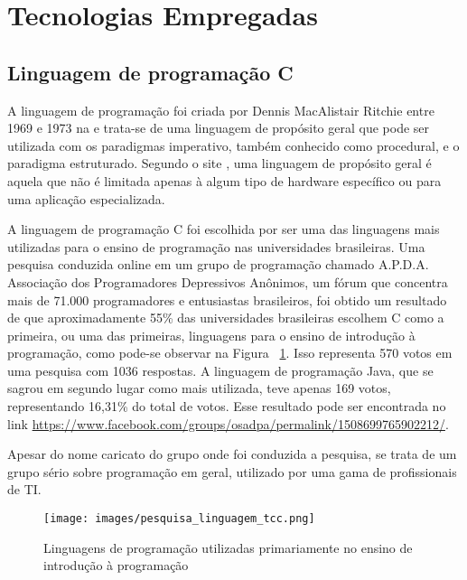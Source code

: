 \documentclass[12pt, %
openright,
oneside, %
a4paper,    %
brazil]{facom-ufu-abntex2}
\begin{document}
\section{Tecnologias Empregadas}

\subsection{Linguagem de programação C}
A linguagem de programação  foi criada por Dennis MacAlistair Ritchie entre 1969 e 1973 na  e trata-se de uma linguagem de propósito geral que pode ser utilizada com os paradigmas imperativo, também conhecido como procedural, e o paradigma estruturado. Segundo o site , uma linguagem de propósito geral é aquela que não é limitada apenas à algum tipo de hardware específico ou para uma aplicação especializada.

A linguagem de programação C foi escolhida por ser uma das linguagens mais utilizadas para o ensino de programação nas universidades brasileiras. Uma pesquisa conduzida online em um grupo de programação chamado A.P.D.A. Associação dos Programadores Depressivos Anônimos, um fórum que concentra mais de 71.000 programadores e entusiastas brasileiros, foi obtido um resultado de que aproximadamente 55\% das universidades brasileiras escolhem C como a primeira, ou uma das primeiras, linguagens para o ensino de introdução à programação, como pode-se observar na Figura ~\ref{fig:pesquisa_linguagem_tcc}. Isso representa 570 votos em uma pesquisa com 1036 respostas. A linguagem de programação Java, que se sagrou em segundo lugar como mais utilizada, teve apenas 169 votos, representando 16,31\% do total de votos. Esse resultado pode ser encontrada no link \hyperref[https://www.facebook.com/groups/osadpa/permalink/1508699765902212/]{https://www.facebook.com/groups/osadpa/permalink/1508699765902212/}.

Apesar do nome caricato do grupo onde foi conduzida a pesquisa, se trata de um grupo sério sobre programação em geral, utilizado por uma gama de profissionais de TI.

\pagebreak
\begin{figure}[htbp]
  \centering
  \texttt{[image: images/pesquisa\_linguagem\_tcc.png]}
  \caption{Linguagens de programação utilizadas primariamente no ensino de introdução à programação}
  \label{fig:pesquisa_linguagem_tcc}
\end{figure}
\end{document}
